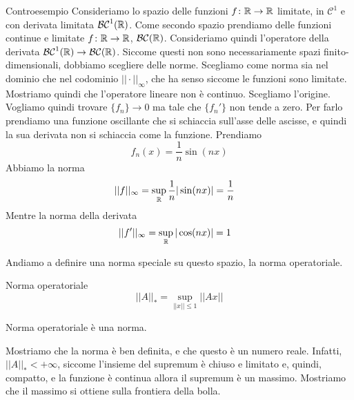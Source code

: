 \documentclass[a4paper]{article}
\begin{document}
\begin{snippetexample}{Controesempio}
    Consideriamo lo spazio delle funzioni \(f\colon \mathbb{R} \to \mathbb{R}\)
    limitate, in \(\mathcal{C}^1\) e con derivata limitata \(\mathcal{BC}^1(\mathbb{R})\).
    Come secondo spazio prendiamo delle funzioni continue e limitate \(f\colon \mathbb{R} \to \mathbb{R}\),
    \(\mathcal{BC}(\mathbb{R})\).
    Consideriamo quindi l'operatore della derivata \(\mathcal{BC}^1(\mathbb{R}) \to \mathcal{BC}(\mathbb{R})\).
    Siccome questi non sono necessariamente spazi finito-dimensionali, dobbiamo scegliere delle norme.
    Scegliamo come norma sia nel dominio che nel codominio \(||\cdot||_\infty\),
    che ha senso siccome le funzioni sono limitate. Mostriamo quindi che l'operatore lineare non è continuo.
    Scegliamo l'origine. Vogliamo quindi trovare \(\{f_n\} \to 0\) ma tale
    che \(\{f_n'\}\) non tende a zero.
    Per farlo prendiamo una funzione oscillante che si schiaccia sull'asse delle ascisse, e quindi la sua derivata
    non si schiaccia come la funzione. Prendiamo
    \[
        f_n(x) = \frac{1}{n}\sin(nx)
    \]
    Abbiamo la norma
    \begin{align*}
        ||f||_\infty &= \sup_{\mathbb{R}} \frac{1}{n}|\sin(nx)|
        = \frac{1}{n}
    \end{align*}
    Mentre la norma della derivata
        \begin{align*}
        ||f'||_\infty &= \sup_{\mathbb{R}} |\cos(nx)| = 1
    \end{align*}
\end{snippetexample}

Andiamo a definire una norma speciale su questo spazio, la norma operatoriale.

\begin{snippetdefinition}{Norma operatoriale}
    \[
        ||A||_* = \sup_{||x|| \leq 1} ||Ax||
    \]
\end{snippetdefinition}

\begin{snippetproposition}{}
    Norma operatoriale è una norma.
\end{snippetproposition}

Mostriamo che la norma è ben definita, e che questo è un numero reale.
Infatti, \(||A||_* < +\infty\), siccome l'insieme del supremum è chiuso e limitato e, quindi, compatto,
e la funzione è continua allora il supremum è un massimo.
Mostriamo che il massimo si ottiene sulla frontiera della bolla.
\end{document}
